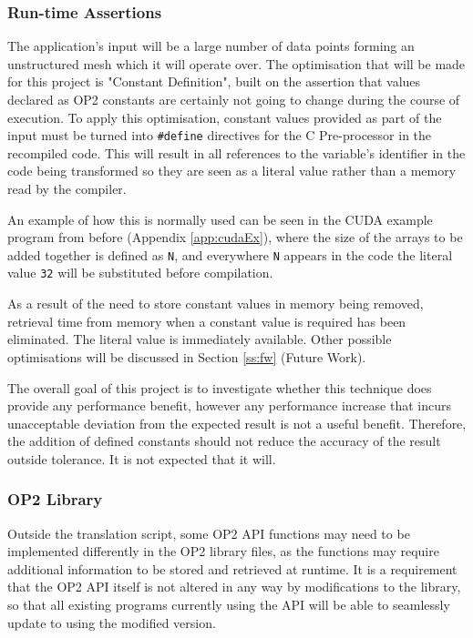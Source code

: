 \subsubsection{Run-time Assertions}
The application's input will be a large number of data points forming an unstructured mesh which it will operate over. The optimisation that will be made for this project is "Constant Definition", built on the assertion that values declared as OP2 constants are certainly not going to change during the course of execution. To apply this optimisation, constant values provided as part of the input must be turned into \verb|#define| directives for the C Pre-processor in the recompiled code. This will result in all references to the variable's identifier in the code being transformed so they are seen as a literal value rather than a memory read by the compiler.
\par
An example of how this is normally used can be seen in the CUDA example program from before (Appendix \ref{app:cudaEx}), where the size of the arrays to be added together is defined as \verb|N|, and everywhere \verb|N| appears in the code the literal value \verb|32| will be substituted before compilation.
\par
As a result of the need to store constant values in memory being removed, retrieval time from memory when a constant value is required has been eliminated. The literal value is immediately available. Other possible optimisations will be discussed in Section \ref{ss:fw} (Future Work).
\par
The overall goal of this project is to investigate whether this technique does provide any performance benefit, however any performance increase that incurs unacceptable deviation from the expected result is not a useful benefit. Therefore, the addition of defined constants should not reduce the accuracy of the result outside tolerance. It is not expected that it will.


\subsubsection{OP2 Library}
Outside the translation script, some OP2 API functions may need to be implemented differently in the OP2 library files, as the functions may require additional information to be stored and retrieved at runtime. It is a requirement that the OP2 API itself is not altered in any way by modifications to the library, so that all existing programs currently using the API will be able to seamlessly update to using the modified version.

